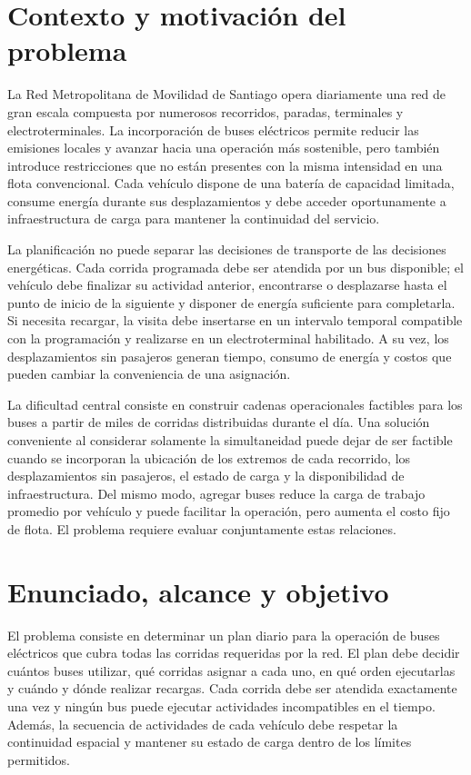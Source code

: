 % 

\section{Contexto y motivación del problema}

La Red Metropolitana de Movilidad de Santiago opera diariamente una red de gran
escala compuesta por numerosos recorridos, paradas, terminales y
electroterminales. La incorporación de buses eléctricos permite reducir las
emisiones locales y avanzar hacia una operación más sostenible, pero también
introduce restricciones que no están presentes con la misma intensidad en una
flota convencional. Cada vehículo dispone de una batería de capacidad limitada,
consume energía durante sus desplazamientos y debe acceder oportunamente a
infraestructura de carga para mantener la continuidad del servicio.

La planificación no puede separar las decisiones de transporte de las decisiones
energéticas. Cada corrida programada debe ser atendida por un bus disponible; el
vehículo debe finalizar su actividad anterior, encontrarse o desplazarse hasta
el punto de inicio de la siguiente y disponer de energía suficiente para
completarla. Si necesita recargar, la visita debe insertarse en un intervalo
temporal compatible con la programación y realizarse en un electroterminal
habilitado. A su vez, los desplazamientos sin pasajeros generan tiempo, consumo
de energía y costos que pueden cambiar la conveniencia de una asignación.

La dificultad central consiste en construir cadenas operacionales factibles para
los buses a partir de miles de corridas distribuidas durante el día. Una
solución conveniente al considerar solamente la simultaneidad puede dejar de
ser factible cuando se incorporan la ubicación de los extremos de cada
recorrido, los desplazamientos sin pasajeros, el estado de carga y la
disponibilidad de infraestructura. Del mismo modo, agregar buses reduce la carga
de trabajo promedio por vehículo y puede facilitar la operación, pero aumenta el
costo fijo de flota. El problema requiere evaluar conjuntamente estas
relaciones.

\section{Enunciado, alcance y objetivo}

El problema consiste en determinar un plan diario para la operación de buses
eléctricos que cubra todas las corridas requeridas por la red. El plan debe
decidir cuántos buses utilizar, qué corridas asignar a cada uno, en qué orden
ejecutarlas y cuándo y dónde realizar recargas. Cada corrida debe ser atendida
exactamente una vez y ningún bus puede ejecutar actividades incompatibles en el
tiempo. Además, la secuencia de actividades de cada vehículo debe respetar la
continuidad espacial y mantener su estado de carga dentro de los límites
permitidos.

